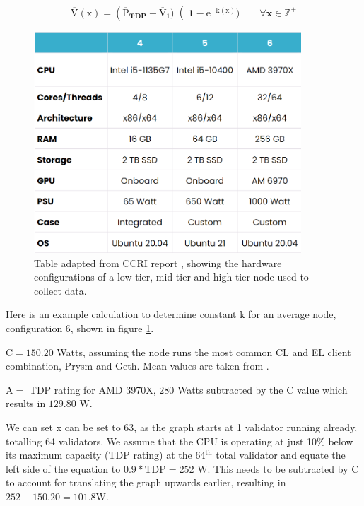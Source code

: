 \begin{equation}
    \label{eqn:ExpDecay}
    \boldsymbol{\mathrm{\overline{V}(\mathrm{x})} = \left(\mathrm{\overline{P}}_{TDP} -\mathrm{\overline{V}_{1}} )\right(1-\mathrm{e}^{-\mathrm{k}(\mathrm{x})}) \qquad \forall x \in \mathbb{Z}^+}
\end{equation}


\begin{figure}[htb!]
    \centering
    \includegraphics[width=10cm,center]{Figures/CCRIhardwareConfigEdit.png}
    \caption{Table adapted from CCRI report \cite{CryptoCarbonRatingsInstitute2022TheNetwork}, showing the hardware configurations of a low-tier, mid-tier and high-tier node used to collect data.}
    \label{Figure:CCRIhardwareConfig}
\end{figure}

\label{DetermineK}
Here is an example calculation to determine constant $\boldsymbol{\mathrm{k}}$ for an average node, configuration 6, shown in figure \ref{Figure:CCRIhardwareConfig}. 

$\boldsymbol{\mathrm{C}} = \boldsymbol{\mathrm{150.20}} $ Watts, assuming the node runs the most common CL and EL client combination, Prysm and Geth. Mean values are taken from  \cite{CryptoCarbonRatingsInstitute2022TheNetwork}.

$\boldsymbol{\mathrm{A}} = $ TDP rating for AMD 3970X, $\boldsymbol{\mathrm{280}} $ Watts \cite{AMDDatabase} subtracted by the $\boldsymbol{\mathrm{C}}$ value which results in $\boldsymbol{\mathrm{129.80}}$ W.

We can set $\boldsymbol{\mathrm{x}} $ can be set to $\boldsymbol{\mathrm{63}} $, as the graph starts at 1 validator running already, totalling 64 validators. We assume that the CPU is operating at just 10\% below its maximum capacity (TDP rating) at the 64$^\mathrm{{th}}$ total validator and equate the left side of the equation to $\boldsymbol{\mathrm{0.9 * TDP}} = 252$ W. This needs to be subtracted by $\boldsymbol{\mathrm{C}}$ to account for translating the graph upwards earlier, resulting in $\boldsymbol{\mathrm{252-150.20 = 101.8}}$W. 

